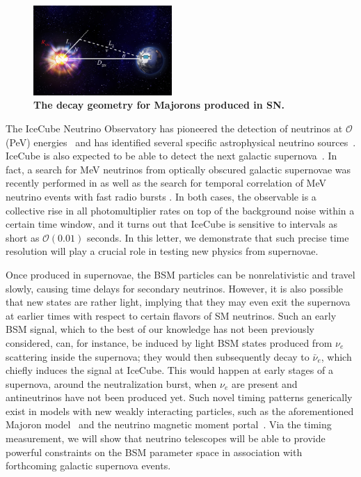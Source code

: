 \documentclass[aps,twocolumn,prl,showpacs,showkeys,preprintnumbers,superscriptaddress,nobibnotes,floatfix,longbibliography,notitlepage,nofootinbib]{revtex4-2}
\begin{document}
\begin{figure}[t!]
    \centering
    \includegraphics[width=0.47\textwidth]{figures/Supernova_Diagram_Draft-1.pdf}
    \caption{\textbf{The decay geometry for Majorons produced in SN.}}
    \label{fig:geometry}
\end{figure}

The IceCube Neutrino Observatory has pioneered the detection of neutrinos at $\mathcal{O}$(PeV) energies~\cite{IceCube:2014stg,IceCube:2018cha} and has identified several specific astrophysical neutrino sources~\cite{IceCube:2018cha,IceCube:2023ame,IceCube:2022der}.
IceCube is also expected to be able to detect the next galactic supernova~\cite{Kopke_2011}.
In fact, a search for MeV neutrinos from optically obscured galactic supernovae was recently performed in \cite{IceCube:2023ogt} as well as the search for temporal correlation of MeV neutrino events with fast radio bursts \cite{IceCube:2019acm}.
In both cases, the observable is a collective rise in all photomultiplier rates on top of the background noise  within a certain time window, and it turns out that IceCube is sensitive to intervals as short as $\mathcal{O}(0.01)$ seconds. 
In this letter, we demonstrate that such precise time resolution will play a crucial role in testing new physics from supernovae.   

Once produced in supernovae, the BSM particles can be nonrelativistic and travel slowly, causing time delays for secondary neutrinos. However, it is also possible that new states are rather light, implying that they may even exit the supernova at earlier times with respect to certain flavors of SM neutrinos.
Such an early BSM signal, which to the best of our knowledge has not been previously considered, can, for instance, be induced by light BSM states produced from $\nu_e$ scattering inside the supernova; they would then subsequently decay to $\bar{\nu}_e$, which chiefly induces the signal at IceCube. 
This would happen at early stages of a supernova, around the neutralization burst, when $\nu_e$ are present and antineutrinos have not been produced yet.
Such novel timing patterns generically exist in models with new weakly interacting particles, such as the aforementioned Majoron model~\cite{Fiorillo:2022cdq} and the neutrino magnetic moment portal~\cite{Magill:2018jla,Brdar:2020quo}.
Via the timing measurement, we will show that neutrino telescopes will be able to provide powerful constraints on the BSM parameter space in association with forthcoming galactic supernova events.\\
\end{document}
